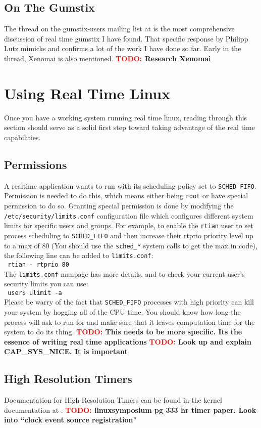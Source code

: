 \documentclass{article}
\newcommand{\TODO}[1]{ {\bf \textcolor{red}{TODO:} #1 }}
\newcommand{\userCom}[1]{\\\indent\indent\texttt{ \small user\$ #1}\\}
\newcommand{\bashCode}[1]{\\\indent\indent\texttt{ \small #1} \\}
\newcommand{\lineCode}[1]{\bashCode{#1}}
\begin{document}
\subsection{On The Gumstix}
The thread on the gumstix-users mailing list at \cite{gumstixRtThread} is the most comprehensive discussion of real time gumstix I have found.  That specific response by Philipp Lutz mimicks and confirms a lot of the work I have done so far. Early in the thread, Xenomai \cite{xenomai} is also mentioned.  \TODO{Research Xenomai}



\section{Using Real Time Linux}
Once you have a working system running real time linux, reading through this section should serve as a solid first step toward taking advantage of the real time capabilities. 

\subsection{Permissions}
A realtime application wants to run with its scheduling policy set to \texttt{SCHED\_FIFO}.  Permission is needed to do this, which means either being \texttt{root} or have special permission to do so.  Granting special permission is done by modifying the \texttt{/etc/security/limits.conf} configuration file which configures different system limits for specific users and groups.  For example, to enable the \texttt{rtian} user to set process scheduling to \texttt{SCHED\_FIFO} and then increase their rtprio priority level up to a max of 80 (You should use the \texttt{sched\_*} system calls to get the max in code), the following line can be added to \texttt{limits.conf}:\lineCode{rtian    -     rtprio    80}The \texttt{limits.conf} manpage has more details, and to check your current user's security limits you can use: \userCom{ulimit -a}

Please be warry of the fact that \texttt{SCHED\_FIFO} processes with high priority can kill your system by hogging all of the CPU time.  You should know how long the process will ask to run for and make sure that it leaves computation time for the system to do its thing.  
\TODO{This needs to be more specific.  Its the essence of writing real time applications}
\TODO{Look up and explain CAP\_SYS\_NICE.  It is important}

\subsection{High Resolution Timers}
Documentation for High Resolution Timers can be found in the kernel documentation at \cite{highResTimerDoc}.
\TODO{linuxsymposium pg 333 hr timer paper.  Look into ``clock event source registration"}
\end{document}
